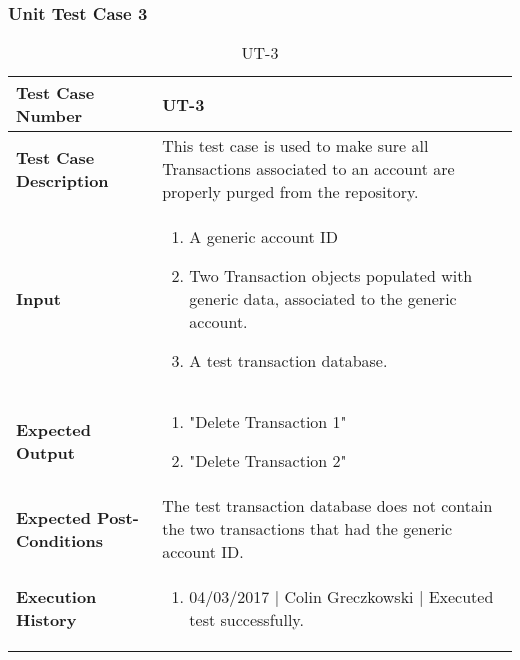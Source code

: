 \documentclass[12pt]{article}
\begin{document}
\subsubsection{Unit Test Case 3} \label{tc:3}
\begin{table}[htbp]
\centering
\caption {UT-3}
\label{UT-3}
\begin{tabularx}{\textwidth}{ | l | X |}
\hline
\textbf{Test Case Number}      &  UT-3                         \\ \hline
\textbf{Test Case Description}    &  This test case is used to make sure all Transactions associated to an account are properly purged from the repository.                \\ \hline
\textbf{Input}         & 	\begin{enumerate}
          \item A generic account ID
	\item Two Transaction objects populated with generic data, associated to the generic account.
	\item A test transaction database.
\end{enumerate} \\ \hline

\textbf{Expected Output}     & \begin{enumerate}
	\item "Delete Transaction 1"
           \item "Delete Transaction 2"
\end{enumerate} \\ \hline
\textbf{Expected Post-Conditions}           & The test transaction database does not contain the two transactions that had the generic account ID.                \\ \hline
\textbf{Execution History}   &  \begin{enumerate}
	\item 04/03/2017 | Colin Greczkowski | Executed test successfully.
\end {enumerate} \\ \hline
\end{tabularx}
\end{table}
\clearpage
\end{document}
